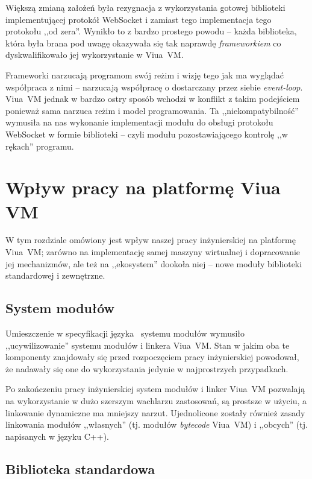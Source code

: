 Większą zmianą założeń była rezygnacja z wykorzystania gotowej biblioteki
implementującej protokół WebSocket i zamiast tego implementacja tego protokołu
,,od zera''. Wynikło to z bardzo prostego powodu -- każda biblioteka, która
była brana pod uwagę okazywała się tak naprawdę \emph{frameworkiem} co
dyskwalifikowało jej wykorzystanie w Viua~VM.

Frameworki narzucają programom swój reżim i wizję tego jak ma wyglądać
współpraca z nimi -- narzucają współpracę o dostarczany przez siebie
\emph{event-loop}. Viua~VM jednak w bardzo ostry sposób wchodzi w konflikt z
takim podejściem ponieważ sama narzuca reżim i model programowania.  Ta
,,niekompatybilność'' wymusiła na nas wykonanie implementacji modułu do obsługi
protokołu WebSocket w formie biblioteki -- czyli modułu pozostawiającego
kontrolę ,,w rękach'' programu.

\section{Wpływ pracy na platformę Viua VM}

W tym rozdziale omówiony jest wpływ naszej pracy inżynierskiej na platformę
Viua~VM; zarówno na implementację samej maszyny wirtualnej i dopracowanie jej
mechanizmów, ale też na ,,ekosystem'' dookoła niej -- nowe moduły biblioteki
standardowej i zewnętrzne.

\subsection{System modułów}

Umieszczenie w specyfikacji języka \ViuAct\ systemu modułów wymusiło
,,ucywilizowanie'' systemu modułów i linkera Viua~VM. Stan w jakim oba te
komponenty znajdowały się przed rozpoczęciem pracy inżynierskiej powodował, że
nadawały się one do wykorzystania jedynie w najprostrzych przypadkach.

Po zakończeniu pracy inżynierskiej system modułów i linker Viua~VM pozwalają na
wykorzystanie w dużo szerszym wachlarzu zastosowań, są prostsze w użyciu, a
linkowanie dynamiczne ma mniejszy narzut. Ujednolicone zostały również zasady
linkowania modułów ,,własnych'' (tj. modułów \emph{bytecode} Viua~VM) i
,,obcych'' (tj. napisanych w języku C++).

\subsection{Biblioteka standardowa}

